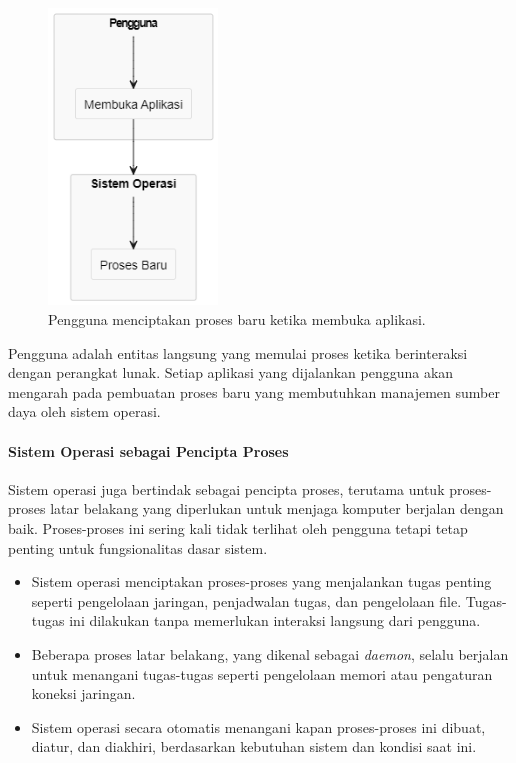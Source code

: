 \documentclass[12pt]{article}
\begin{document}
\begin{figure}[h]
    \centering
    \includegraphics[width=0.4\textwidth]{asset/user process creation.png}
    \caption{Pengguna menciptakan proses baru ketika membuka aplikasi.}
\end{figure}

Pengguna adalah entitas langsung yang memulai proses ketika berinteraksi dengan perangkat lunak. Setiap aplikasi yang dijalankan pengguna akan mengarah pada pembuatan proses baru yang membutuhkan manajemen sumber daya oleh sistem operasi.

\paragraph{Sistem Operasi sebagai Pencipta Proses}

Sistem operasi juga bertindak sebagai pencipta proses, terutama untuk proses-proses latar belakang yang diperlukan untuk menjaga komputer berjalan dengan baik. Proses-proses ini sering kali tidak terlihat oleh pengguna tetapi tetap penting untuk fungsionalitas dasar sistem.

\begin{itemize}
    \item  Sistem operasi menciptakan proses-proses yang menjalankan tugas penting seperti pengelolaan jaringan, penjadwalan tugas, dan pengelolaan file. Tugas-tugas ini dilakukan tanpa memerlukan interaksi langsung dari pengguna.
    \item  Beberapa proses latar belakang, yang dikenal sebagai \textit{daemon}, selalu berjalan untuk menangani tugas-tugas seperti pengelolaan memori atau pengaturan koneksi jaringan.
    \item  Sistem operasi secara otomatis menangani kapan proses-proses ini dibuat, diatur, dan diakhiri, berdasarkan kebutuhan sistem dan kondisi saat ini.
\end{itemize}
\end{document}
